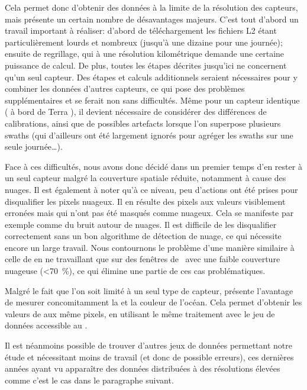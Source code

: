 Cela permet donc d'obtenir des données à la limite de la résolution des capteurs, mais présente un certain nombre de désavantages majeurs.
C'est tout d'abord un travail important à réaliser: d'abord de téléchargement les fichiers L2 étant particulièrement lourds et nombreux (jusqu'à une dizaine pour une journée); ensuite de regrillage, qui à une résolution kilométrique demande une certaine puissance de calcul.
De plus, toutes les étapes décrites jusqu'ici ne concernent qu'un seul capteur.
Des étapes et calculs additionnels seraient nécessaires pour y combiner les données d'autres capteurs, ce qui pose des problèmes supplémentaires et se ferait non sans difficultés.
Même pour un capteur identique ( à bord de Terra ), il devient nécessaire de considérer des différences de calibrations, ainsi que de possibles artefacts lorsque l'on superpose plusieurs swaths (qui d'ailleurs ont été largement ignorés pour agréger les swaths sur une seule journée\dots).

Face à ces difficultés, nous avons donc décidé dans un premier temps d'en rester à un seul capteur malgré la couverture spatiale réduite, notamment à cause des nuages.
Il est également à noter qu'à ce niveau, peu d'actions ont été prises pour disqualifier les pixels nuageux.
Il en résulte des pixels aux valeurs visiblement erronées mais qui n'ont pas été masqués comme nuageux.
Cela se manifeste par exemple comme du bruit autour de nuages.
Il est difficile de les disqualifier correctement sans un bon algorithme de détection de nuage, ce qui nécessite encore un large travail.
Nous contournons le problème d'une manière similaire à celle de \textcite{liu_2016} en ne travaillant que sur des fenêtres de~ avec une faible couverture nuageuse (\textless\qty{70}{\percent}), ce qui élimine une partie de ces cas problématiques.

Malgré le fait que l'on soit limité à un seul type de capteur,  présente l'avantage de mesurer concomitamment la  et la couleur de l'océan.
Cela permet d'obtenir les valeurs de  aux même pixels, en utilisant le même traitement avec le jeu de données accessible au  \parencite{chl_modis}.

Il est néanmoins possible de trouver d'autres jeux de données permettant notre étude et nécessitant moins de travail (et donc de possible erreurs), ces dernières années ayant vu apparaître des données distribuées à des résolutions élevées comme c'est le cas dans le paragraphe suivant.

